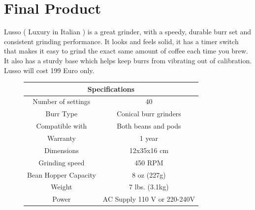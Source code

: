 
\chapter*{ Final Product }
\noindent Lusso ( Luxury in Italian ) is a great grinder, with a speedy, durable burr set and consistent grinding performance. It looks and feels solid, it has a timer switch that makes it easy to grind the exact same amount of coffee each time you brew. It also has a sturdy base which helps keep burrs from vibrating out of calibration. Lusso will cost 199 Euro only.
\begin{figure}[h]
    \begin{minipage}[c]{.6\textwidth}%
       \begin{tabular}{|c|c|} 
 \hline
 \multicolumn{2}{|c|}{Specifications} \\
 \hline\hline
 Number of settings & 40 \\ 
 \hline
  Burr Type & Conical burr grinders \\
 \hline
 Compatible with & Both beans and pods \\
 \hline
 Warranty & 1 year \\
 \hline
 Dimensions & 12x35x16 cm \\
 \hline
 Grinding speed & 450 RPM \\
 \hline
 Bean Hopper Capacity & 8 oz (227g) \\
 \hline
 Weight &  7 lbs. (3.1kg) \\
 \hline
 Power &  AC Supply 110 V or 220-240V \\
 \hline
 \end{tabular}


\end{minipage}
\end{figure}
